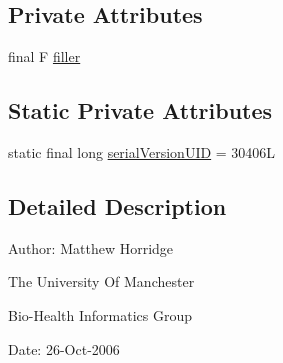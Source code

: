 \subsection*{Private Attributes}
\begin{DoxyCompactItemize}
\item 
final F \hyperlink{classuk_1_1ac_1_1manchester_1_1cs_1_1owl_1_1owlapi_1_1_o_w_l_quantified_restriction_impl_3_01_r_e04a97c08083d9e3c6f10e535b1571d1_a5a244acc172337d0ead6badb3722fc93}{filler}
\end{DoxyCompactItemize}
\subsection*{Static Private Attributes}
\begin{DoxyCompactItemize}
\item 
static final long \hyperlink{classuk_1_1ac_1_1manchester_1_1cs_1_1owl_1_1owlapi_1_1_o_w_l_quantified_restriction_impl_3_01_r_e04a97c08083d9e3c6f10e535b1571d1_ab78d805009a7ce090cec7eefc4f85b24}{serial\-Version\-U\-I\-D} = 30406\-L
\end{DoxyCompactItemize}


\subsection{Detailed Description}
Author\-: Matthew Horridge\par
 The University Of Manchester\par
 Bio-\/\-Health Informatics Group\par
 Date\-: 26-\/\-Oct-\/2006\par
\par
 

